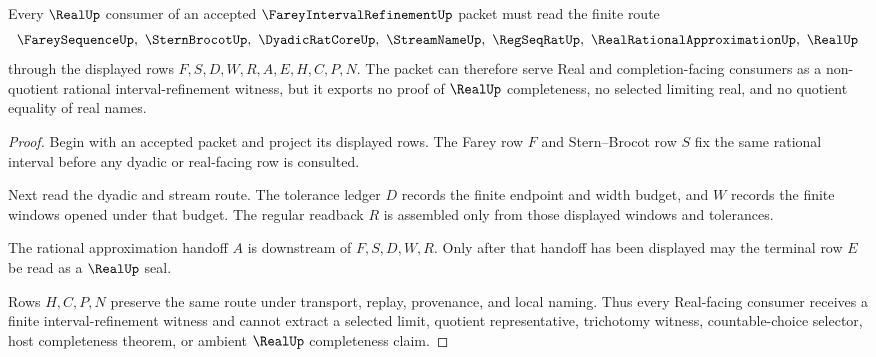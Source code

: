 \begin{theorem}
\label{thm:farey-interval-refinement-real-readback}
Every $\RealUp$ consumer of an accepted $\FareyIntervalRefinementUp$ packet must read the finite route
$$
\FareySequenceUp,\ \SternBrocotUp,\ \DyadicRatCoreUp,\ \StreamNameUp,\ \RegSeqRatUp,\ \RealRationalApproximationUp,\ \RealUp
$$
through the displayed rows $F,S,D,W,R,A,E,H,C,P,N$. The packet can therefore serve Real and completion-facing consumers as a non-quotient rational interval-refinement witness, but it exports no proof of $\RealUp$ completeness, no selected limiting real, and no quotient equality of real names.
\end{theorem}
\begin{proof}
Begin with an accepted packet and project its displayed rows. The Farey row $F$ and Stern--Brocot row $S$ fix the same rational interval before any dyadic or real-facing row is consulted.

Next read the dyadic and stream route. The tolerance ledger $D$ records the finite endpoint and width budget, and $W$ records the finite windows opened under that budget. The regular readback $R$ is assembled only from those displayed windows and tolerances.

The rational approximation handoff $A$ is downstream of $F,S,D,W,R$. Only after that handoff has been displayed may the terminal row $E$ be read as a $\RealUp$ seal.

Rows $H,C,P,N$ preserve the same route under transport, replay, provenance, and local naming. Thus every Real-facing consumer receives a finite interval-refinement witness and cannot extract a selected limit, quotient representative, trichotomy witness, countable-choice selector, host completeness theorem, or ambient $\RealUp$ completeness claim.
\end{proof}


